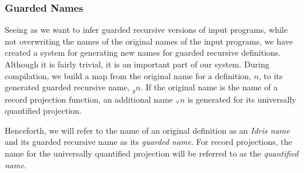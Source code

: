   

\subsubsection{Guarded Names}
Seeing as we want to infer guarded recursive versions of input programs, while not
overwriting the names of the original names of the input programs, we have created a system for
generating new names for guarded recursive definitions. Although it is fairly
trivial, it is an important part of our system. During compilation, we build a
map from the original name for a definition, $n$, to its generated guarded recursive name,
$_gn$. If the original name is the name of a record projection function, an
additional name $_{\forall}n$ is generated for its universally quantified
projection. 

Henceforth, we will refer to the name of an original definition as
an \emph{Idris name} and its guarded recursive name as its \emph{guarded name}. For
record projections, the name for the universally quantified projection will be
referred to as the \emph{quantified name}. 


